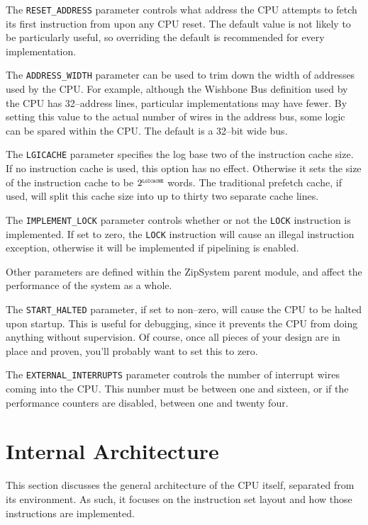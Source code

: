 \documentclass{gqtekspec}
\begin{document}
The {\tt RESET\_ADDRESS} parameter controls what address the CPU attempts to
fetch its first instruction from upon any CPU reset.  The default value is
not likely to be particularly useful, so overriding the default is recommended
for every implementation.

The {\tt ADDRESS\_WIDTH} parameter can be used to trim down the width of
addresses used by the CPU.  For example, although the Wishbone Bus definition
used by the CPU  has 32--address lines, particular implementations may have
fewer.  By setting this value to the actual number of wires in the address
bus, some logic can be spared within the CPU.  The default is a 32--bit wide
bus.

The {\tt LGICACHE} parameter specifies the log base two of the instruction
cache size.  If no instruction cache is used, this option has no effect. 
Otherwise it sets the size of the instruction cache to be
$2^{\mbox{\tiny\tt LGICACHE}}$ words.  The traditional prefetch cache, if used,
will split this cache size into up to thirty two separate cache lines.

The {\tt IMPLEMENT\_LOCK} parameter controls whether or not the {\tt LOCK}
instruction is implemented.  If set to zero, the {\tt LOCK} instruction will
cause an illegal instruction exception, otherwise it will be implemented if
pipelining is enabled.

Other parameters are defined within the ZipSystem parent module, and affect
the performance of the system as a whole.

The {\tt START\_HALTED} parameter, if set to non--zero, will cause the 
CPU to be halted upon startup.  This is useful for debugging, since it prevents
the CPU from doing anything without supervision.  Of course, once all pieces
of your design are in place and proven, you'll probably want to set this to
zero.

The {\tt EXTERNAL\_INTERRUPTS} parameter controls the number of interrupt
wires coming into the CPU.  This number must be between one and sixteen,
or if the performance counters are disabled, between one and twenty four.

\section{Internal Architecture}\label{sec:internals}

This section discusses the general architecture of the CPU itself, separated
from its environment.  As such, it focuses on the instruction set layout
and how those instructions are implemented.
\end{document}
